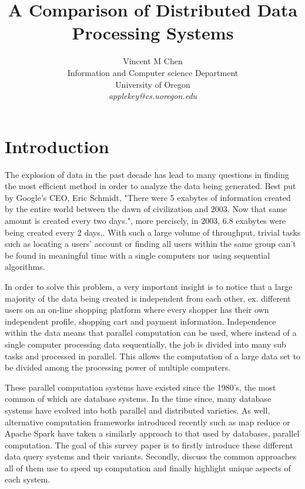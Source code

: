 \documentclass[10pt,twocolumn]{IEEEtran11}
\begin{document}


\title{\Large \bf A Comparison of Distributed Data Processing Systems}
\author{
Vincent M Chen\\
Information and Computer science Department\\
University of Oregon\\
{\em applekey@cs.uoregon.edu}
}
\maketitle

\section{Introduction}
The explosion of data in the past decade has lead to many questions in finding the most efficient method in order to analyze the data being generated. Best put by Google's CEO, Eric Schmidt, "There were 5 exabytes of information created by the entire world between the dawn of civilization and 2003. Now that same amount is created every two days.", more percisely, in 2003, 6.8 exabytes were being created every 2 days,\cite{gantz2010digital}.  With such a large volume of throughput, trivial tasks such as locating a users' account or finding all users within the same group can't be found in meaningful time with a single computers nor using sequential algorithms.
\par
In order to solve this problem, a very important insight is to notice that a large majority of the data being created is independent from each other, ex. different users on an on-line shopping platform where every shopper has their own independent profile, shopping cart and payment information.  Independence within the data means that parallel computation can be used, where instead of a single computer processing data sequentially, the job is divided into many sub tasks and processed in parallel.  This allows the computation of a large data set to be divided among the processing power of multiple computers.
\par
These parallel computation systems have existed since the 1980's, the most common of which are database systems. In the time since, many database systems have evolved into both parallel and distributed varieties.  As well, alternative computation frameworks introduced recently such as map reduce or Apache Spark have taken a  similarly approach to that used by databases, parallel computation.  The goal of this survey paper is to firstly introduce these different data query systems and their variants.  Secondly, discuss the common approaches all of them use to speed up computation and finally highlight unique aspects of each system.
\end{document}
